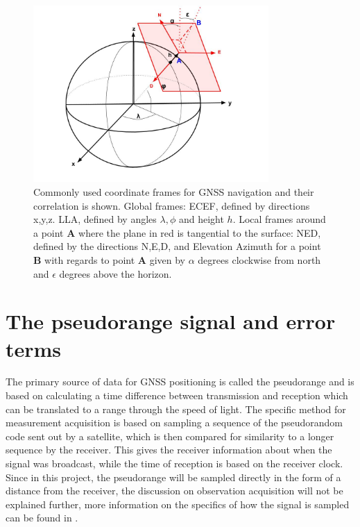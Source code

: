 \begin{figure}[!h]
\centering
\includegraphics[width=0.8\textwidth]{Background/allCS}
\caption{\label{fig:CF} Commonly used coordinate frames for GNSS navigation and their correlation is shown. Global frames: ECEF, defined by directions x,y,z. LLA, defined by angles $\lambda, \phi$ and height $h$. Local frames around a point {\color{blue} \bf A} where the plane in red is tangential to the surface: NED, defined by the directions {\color{red} N,E,D}, and Elevation Azimuth for a point {\color{blue} \bf B} with regards to point {\color{blue} \bf A} given by $\alpha$ degrees clockwise from north and $\epsilon$ degrees above the horizon.}
\end{figure}



\section{The pseudorange signal and error terms}\label{signalAndError}
The primary source of data for GNSS positioning is called the pseudorange and is based on calculating a time difference between transmission and reception which can be translated to a range through the speed of light. The specific method for measurement acquisition is based on sampling a sequence of the pseudorandom code sent out by a satellite, which is then compared for similarity to a longer sequence by the receiver. This gives the receiver information about when the signal was broadcast, while the time of reception is based on the receiver clock. Since in this project, the pseudorange will be sampled directly in the form of a distance from the receiver, the discussion on observation acquisition will not be explained further, more information on the specifics of how the signal is sampled can be found in \cite{Jeffrey}. 
